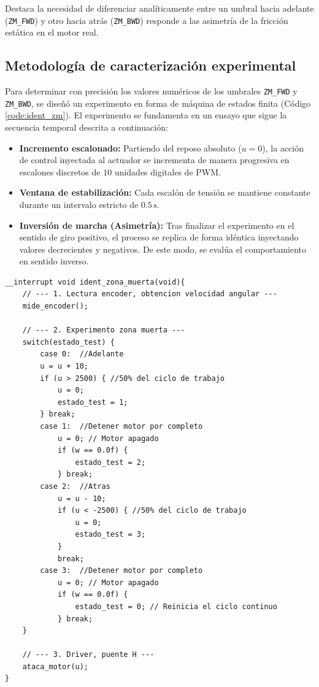 \documentclass[11pt,fleqn]{book} %
\begin{document}
Destaca la necesidad de diferenciar analíticamente entre un umbral hacia adelante (\texttt{ZM\_FWD}) y otro hacia atrás (\texttt{ZM\_BWD}) responde a las asimetría de la fricción estática en el motor real. 

\subsection{Metodología de caracterización experimental}

Para determinar con precisión los valores numéricos de los umbrales \texttt{ZM\_FWD} y \texttt{ZM\_BWD}, se diseñó un experimento en forma de máquina de estados finita (Código \ref{code:ident_zm}). El experimento se fundamenta en un ensayo que sigue la secuencia temporal descrita a continuación:

\begin{itemize}
	\item \textbf{Incremento escalonado:} Partiendo del reposo absoluto ($u = 0$), la acción de control inyectada al actuador se incrementa de manera progresiva en escalones discretos de $10$ unidades digitales de PWM.
	
	\item \textbf{Ventana de estabilización:} Cada escalón de tensión se mantiene constante durante un intervalo estricto de $0.5\,\text{s}$. 
	
	\item \textbf{Inversión de marcha (Asimetría):} Tras finalizar el experimento en el sentido de giro positivo, el proceso se replica de forma idéntica inyectando valores decrecientes y negativos. De este modo, se evalúa el comportamiento en sentido inverso.
\end{itemize}

\begin{lstlisting}[style=estiloC, caption={Identificación de la zona muerta por código}, label={code:ident_zm}]
__interrupt void ident_zona_muerta(void){
	// --- 1. Lectura encoder, obtencion velocidad angular ---
	mide_encoder(); 
	
	// --- 2. Experimento zona muerta ---
	switch(estado_test) {
		case 0:  //Adelante
		u = u + 10; 
		if (u > 2500) { //50% del ciclo de trabajo
			u = 0; 
			estado_test = 1; 
		} break;
		case 1:  //Detener motor por completo
			u = 0; // Motor apagado
			if (w == 0.0f) { 
				estado_test = 2;
			} break;
		case 2:  //Atras
			u = u - 10; 
			if (u < -2500) { //50% del ciclo de trabajo
				u = 0; 
				estado_test = 3; 
			}
			break;
		case 3:  //Detener motor por completo
			u = 0; // Motor apagado
			if (w == 0.0f) { 
				estado_test = 0; // Reinicia el ciclo continuo
			} break;
	}
	
	// --- 3. Driver, puente H ---
	ataca_motor(u); 
}
\end{lstlisting}
\end{document}

